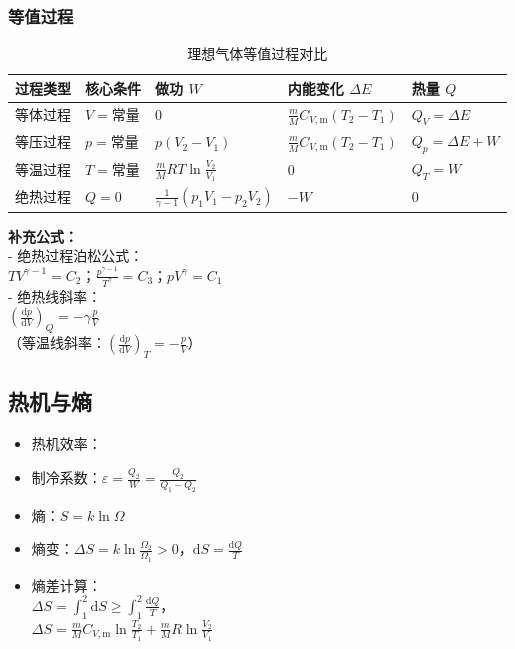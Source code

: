 \subsubsection{等值过程}
\begin{table}[htbp]
    \centering
    \scriptsize
    \begin{tabular}{@{}p{1.2cm}|p{1.4cm}|p{2.6cm}|p{2.6cm}|p{2.6cm}@{}}
        \toprule
        \rowcolor{tablehead} 过程类型 & 核心条件 & 做功 $W$ & 内能变化 $\Delta E$ & 热量 $Q$ \\
        \midrule
        等体过程 & $V=$常量 & $0$ & $\frac{m}{M}C_{V,\text{m}}(T_2-T_1)$ & $Q_V = \Delta E$ \\
        \midrule
        等压过程 & $p=$常量 & $p(V_2-V_1)$ & $\frac{m}{M}C_{V,\text{m}}(T_2-T_1)$ & $Q_p = \Delta E + W$ \\
        \midrule
        等温过程 & $T=$常量 & $\frac{m}{M}RT\ln\frac{V_2}{V_1}$ & $0$ & $Q_T = W$ \\
        \midrule
        绝热过程 & $Q=0$ & $\frac{1}{\gamma-1}(p_1V_1-p_2V_2)$ & $-W$ & $0$ \\
        \bottomrule
    \end{tabular}
    \caption{理想气体等值过程对比}
    \label{tab:thermo_process}
    \vspace{-0.5em}
\end{table}

\textbf{补充公式：}\\
- 绝热过程泊松公式：\\
  $TV^{\gamma-1}=C_2$；$\frac{p^{\gamma-1}}{T^\gamma}=C_3$；$pV^\gamma=C_1$\\
- 绝热线斜率：\\
  $\left( \frac{\mathrm{d}p}{\mathrm{d}V} \right)_Q = -\gamma \frac{p}{V}$ \\
  （等温线斜率：$\left( \frac{\mathrm{d}p}{\mathrm{d}V} \right)_T = -\frac{p}{V}$）

\subsection{热机与熵}
\begin{itemize}
    \item 热机效率：
    \item 制冷系数：$\varepsilon = \frac{Q_2}{W} = \frac{Q_2}{Q_1 - Q_2}$
    \item 熵：$S = k\ln \Omega$
    \item 熵变：$\Delta S = k\ln \frac{\Omega_2}{\Omega_1} > 0$，$\mathrm{d}S = \frac{\mathrm{d}Q}{T}$
    \item 熵差计算：\\
      $\Delta S = \int_{1}^{2} \mathrm{d}S \geqslant \int_{1}^{2} \frac{\mathrm{d}Q}{T}$，\\
      $\Delta S = \frac{m}{M} C_{V,\text{m}} \ln\frac{T_2}{T_1} + \frac{m}{M} R \ln\frac{V_2}{V_1}$
\end{itemize}

